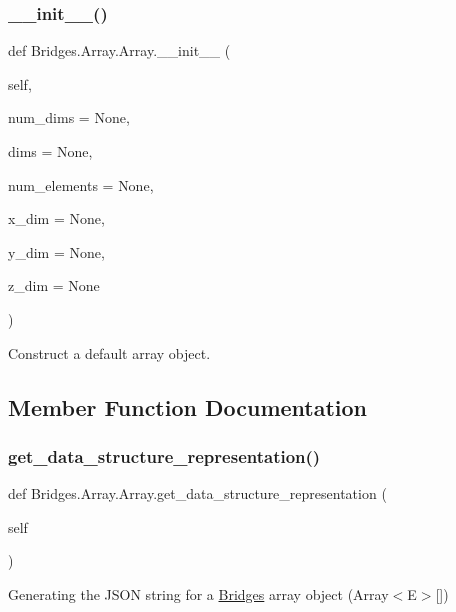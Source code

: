 \subsubsection{\texorpdfstring{\+\_\+\+\_\+init\+\_\+\+\_\+()}{\_\_init\_\_()}}
{\footnotesize\ttfamily def Bridges.\+Array.\+Array.\+\_\+\+\_\+init\+\_\+\+\_\+ (\begin{DoxyParamCaption}\item[{}]{self,  }\item[{}]{num\+\_\+dims = {\ttfamily None},  }\item[{}]{dims = {\ttfamily None},  }\item[{}]{num\+\_\+elements = {\ttfamily None},  }\item[{}]{x\+\_\+dim = {\ttfamily None},  }\item[{}]{y\+\_\+dim = {\ttfamily None},  }\item[{}]{z\+\_\+dim = {\ttfamily None} }\end{DoxyParamCaption})}



Construct a default array object. 



\subsection{Member Function Documentation}
\mbox{\label{class_bridges_1_1_array_1_1_array_a2ff4613545bb6df7554b8f87fc7473fd}} 
\subsubsection{\texorpdfstring{get\+\_\+data\+\_\+structure\+\_\+representation()}{get\_data\_structure\_representation()}}
{\footnotesize\ttfamily def Bridges.\+Array.\+Array.\+get\+\_\+data\+\_\+structure\+\_\+representation (\begin{DoxyParamCaption}\item[{}]{self }\end{DoxyParamCaption})}



Generating the J\+S\+ON string for a \mbox{\hyperlink{namespace_bridges_1_1_bridges}{Bridges}} array object (Array$<$\+E$>$\mbox{[}\mbox{]}) 


